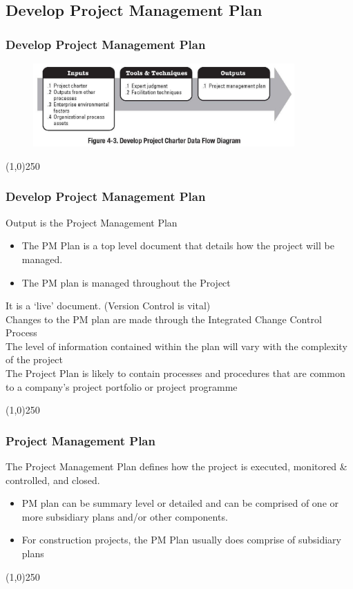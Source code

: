 \subsection{Develop Project Management Plan}

%
\begin{frame}
\frametitle{Develop Project Management Plan}
\begin{figure}
	\centering
		\includegraphics[width = 10cm]{images/fig4-3.jpg}
	\label{fig:4-3}
\end{figure}
\end{frame}\begin{center}\line(1,0){250}\end{center}




\begin{frame}
\frametitle{Develop Project Management Plan}
Output is the Project Management Plan
\begin{itemize}
	\item The PM Plan is a top level document that details how the project will be managed.
	\item The PM plan is managed throughout the Project
\end{itemize}
It is a `live' document.  (Version Control is vital)\\
Changes to the PM plan are made through the Integrated Change Control Process\\
The level of information contained within the plan will vary with the complexity of the project\\
The Project Plan is likely to contain processes and procedures that are common to a company's project portfolio or project programme\\
\end{frame}\begin{center}\line(1,0){250}\end{center}
%
%


%
%

\begin{frame}
\frametitle{Project Management Plan}
The Project Management Plan defines how the project is executed, monitored \& controlled, and closed.  
\begin{itemize}
	\item PM plan can be summary level or detailed and can be comprised of one or more subsidiary plans and/or other components.
	\item For construction projects, the PM Plan usually does comprise of subsidiary plans
\end{itemize}	
	
\end{frame}\begin{center}\line(1,0){250}\end{center}
%
%


